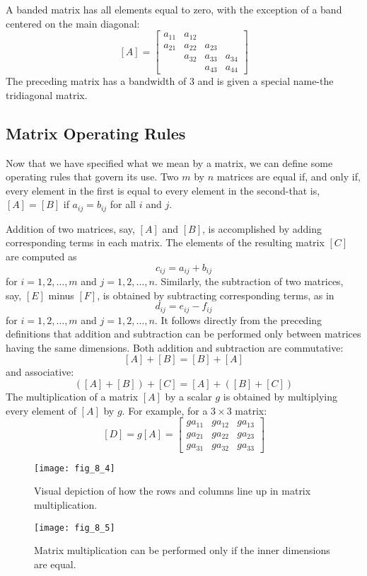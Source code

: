 \documentclass[../main.tex]{subfiles}
\begin{document}
A banded matrix has all elements equal to zero, with the exception of a band centered on the main diagonal:
$$
[A]=\left[\begin{array}{llll}
a_{11} & a_{12} & & \\
a_{21} & a_{22} & a_{23} & \\
& a_{32} & a_{33} & a_{34} \\
& & a_{43} & a_{44}
\end{array}\right]
$$
The preceding matrix has a bandwidth of 3 and is given a special name-the tridiagonal matrix.

\subsection{Matrix Operating Rules}

Now that we have specified what we mean by a matrix, we can define some operating rules that govern its use. Two $m$ by $n$ matrices are equal if, and only if, every element in the first is equal to every element in the second-that is, $[A]=[B]$ if $a_{i j}=b_{i j}$ for all $i$ and $j$.

Addition of two matrices, say, $[A]$ and $[B]$, is accomplished by adding corresponding terms in each matrix. The elements of the resulting matrix $[C]$ are computed as
$$
c_{i j}=a_{i j}+b_{i j}
$$
for $i=1,2, \ldots, m$ and $j=1,2, \ldots, n$. Similarly, the subtraction of two matrices, say, $[E]$ minus $[F]$, is obtained by subtracting corresponding terms, as in
$$
d_{i j}=e_{i j}-f_{i j}
$$
for $i=1,2, \ldots, m$ and $j=1,2, \ldots, n$. It follows directly from the preceding definitions that addition and subtraction can be performed only between matrices having the same dimensions.
Both addition and subtraction are commutative:
$$
[A]+[B]=[B]+[A]
$$
and associative:
$$
([A]+[B])+[C]=[A]+([B]+[C])
$$
The multiplication of a matrix $[A]$ by a scalar $g$ is obtained by multiplying every element of $[A]$ by $g$. For example, for a $3 \times 3$ matrix:
$$
[D]=g[A]=\left[\begin{array}{lll}
g a_{11} & g a_{12} & g a_{13} \\
g a_{21} & g a_{22} & g a_{23} \\
g a_{31} & g a_{32} & g a_{33}
\end{array}\right]
$$

\begin{multicols}{2}

    \begin{figure}[H]
        \centering
        \texttt{[image: fig\_8\_4]}
        \caption{\textsf{Visual depiction of how the rows and columns line up in
        matrix multiplication.}}
        \label{fig:fig_8_4}
    \end{figure}
    
    \begin{figure}[H]
        \centering
        \texttt{[image: fig\_8\_5]}
        \caption{\textsf{Matrix multiplication can be performed only if
        the inner dimensions are equal.}}
        \label{fig:fig_8_5}
    \end{figure}
    
\end{multicols}
\end{document}

